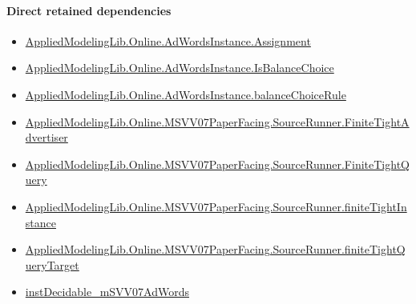 \documentclass[10pt]{article}
\begin{document}
\paragraph{Direct retained dependencies}
\begin{itemize}\raggedright
\item \hyperlink{governing-declaration-1626714e7e9b5a7b}{Applied\allowbreak{}Modeling\allowbreak{}Lib.\allowbreak{}Online.\allowbreak{}Ad\allowbreak{}Words\allowbreak{}Instance.\allowbreak{}Assignment}
\item \hyperlink{governing-declaration-596b56e9de646cec}{Applied\allowbreak{}Modeling\allowbreak{}Lib.\allowbreak{}Online.\allowbreak{}Ad\allowbreak{}Words\allowbreak{}Instance.\allowbreak{}Is\allowbreak{}Balance\allowbreak{}Choice}
\item \hyperlink{governing-declaration-47ab5f144ca5a666}{Applied\allowbreak{}Modeling\allowbreak{}Lib.\allowbreak{}Online.\allowbreak{}Ad\allowbreak{}Words\allowbreak{}Instance.\allowbreak{}balance\allowbreak{}Choice\allowbreak{}Rule}
\item \hyperlink{governing-declaration-48ee018f3cdad0d9}{Applied\allowbreak{}Modeling\allowbreak{}Lib.\allowbreak{}Online.\allowbreak{}MSVV07\allowbreak{}Paper\allowbreak{}Facing.\allowbreak{}Source\allowbreak{}Runner.\allowbreak{}Finite\allowbreak{}Tight\allowbreak{}Advertiser}
\item \hyperlink{governing-declaration-feae64ffc2ccaca7}{Applied\allowbreak{}Modeling\allowbreak{}Lib.\allowbreak{}Online.\allowbreak{}MSVV07\allowbreak{}Paper\allowbreak{}Facing.\allowbreak{}Source\allowbreak{}Runner.\allowbreak{}Finite\allowbreak{}Tight\allowbreak{}Query}
\item \hyperlink{governing-declaration-a1384cbd1c9eb5e4}{Applied\allowbreak{}Modeling\allowbreak{}Lib.\allowbreak{}Online.\allowbreak{}MSVV07\allowbreak{}Paper\allowbreak{}Facing.\allowbreak{}Source\allowbreak{}Runner.\allowbreak{}finite\allowbreak{}Tight\allowbreak{}Instance}
\item \hyperlink{governing-declaration-16f142aac648bfce}{Applied\allowbreak{}Modeling\allowbreak{}Lib.\allowbreak{}Online.\allowbreak{}MSVV07\allowbreak{}Paper\allowbreak{}Facing.\allowbreak{}Source\allowbreak{}Runner.\allowbreak{}finite\allowbreak{}Tight\allowbreak{}Query\allowbreak{}Target}
\item \hyperlink{governing-declaration-9d9905573bef867c}{inst\allowbreak{}Decidable\_\allowbreak{}m\allowbreak{}SVV07\allowbreak{}Ad\allowbreak{}Words}
\end{itemize}
\hypertarget{governing-declaration-2fb67e546b83ad59}{}
\end{document}
